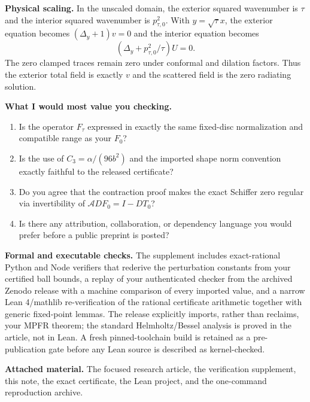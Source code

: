 \documentclass[10pt]{article}
\begin{document}
\textbf{Physical scaling.}
In the unscaled domain, the exterior squared wavenumber is $\tau$ and the
interior squared wavenumber is $p_{\tau,0}^2$.  With
$y=\sqrt\tau x$, the exterior equation becomes $(\Delta_y+1)v=0$ and the
interior equation becomes
\[
 (\Delta_y+p_{\tau,0}^2/\tau)U=0.
\]
The zero clamped traces remain zero under conformal and dilation factors.
Thus the exterior total field is exactly $v$ and the scattered field is the
zero radiating solution.

\textbf{What I would most value you checking.}
\begin{enumerate}[leftmargin=1.5em,itemsep=1pt,topsep=2pt]
 \item Is the operator $F_\tau$ expressed in exactly the same fixed-disc
 normalization and compatible range as your $F_0$?
 \item Is the use of $C_3=\alpha/(96b^2)$ and the imported shape norm
 convention exactly faithful to the released certificate?
 \item Do you agree that the contraction proof makes the exact Schiffer zero
 regular via invertibility of $\mathcal A DF_0=I-DT_0$?
 \item Is there any attribution, collaboration, or dependency language you
 would prefer before a public preprint is posted?
\end{enumerate}

\textbf{Formal and executable checks.}
The supplement includes exact-rational Python and Node verifiers that
rederive the perturbation constants from your certified ball bounds, a
replay of your authenticated checker from the archived Zenodo release with
a machine comparison of every imported value, and a narrow Lean 4/mathlib
re-verification of the rational certificate arithmetic together with
generic fixed-point lemmas.  The release explicitly imports, rather than
reclaims, your MPFR theorem; the standard Helmholtz/Bessel analysis is
proved in the article, not in Lean.  A fresh pinned-toolchain build is
retained as a pre-publication gate before any Lean source is described as
kernel-checked.

\textbf{Attached material.}
The focused research article, the verification supplement, this note, the exact certificate, the Lean project, and the one-command reproduction archive.
\end{document}
